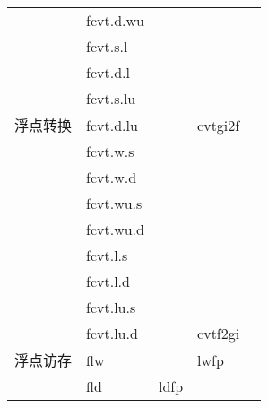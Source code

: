 \begin{longtable}{lllll}
                               & fcvt.d.wu                        &                              &                                \\
                               & fcvt.s.l                         &                              &                                \\
                               & fcvt.d.l                         &                              &                                \\
                               & fcvt.s.lu                        &                              &                                \\
                               \hline
    浮点转换                     & fcvt.d.lu                        & \multirow{-8}{*}{}           & \multirow{-8}{*}{cvtgi2f}      \\
                               & fcvt.w.s                         &                              &                                \\
                               & fcvt.w.d                         &                              &                                \\
                               & fcvt.wu.s                        &                              &                                \\
                               & fcvt.wu.d                        &                              &                                \\
                               & fcvt.l.s                         &                              &                                \\
                               & fcvt.l.d                         &                              &                                \\
                               & fcvt.lu.s                        &                              &                                \\
                               & fcvt.lu.d                        & \multirow{-8}{*}{}           & \multirow{-8}{*}{cvtf2gi}      \\
    \hline
    浮点访存                       & flw                              &                              & lwfp                           \\
                               & fld                              & ldfp                         &                                \\

\end{longtable}
